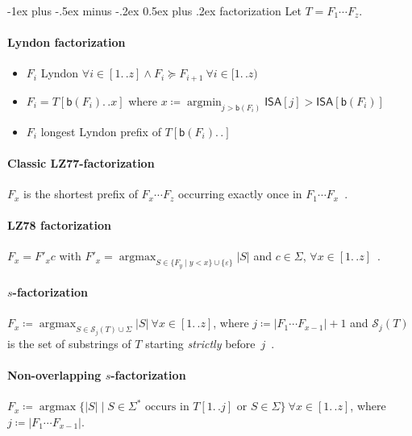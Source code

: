 \documentclass[10pt,landscape]{article}
\makeatletter
\renewcommand{\section}{\@startsection{section}{1}{0mm}%
                                {-1ex plus -.5ex minus -.2ex}%
                                {0.5ex plus .2ex}%
                                {\normalfont\large\itshape}}
\newcommand*{\IC}{\mathbin{{.}\,{.}}} %
\newcommand*{\abs}[1]{\ensuremath{|#1|}} %
\newcommand*{\menge}[1]{\ensuremath{\{#1\}}} %
\newcommand*{\instancename}[1]{\ensuremath{\mathsf{#1}}} %
\newcommand*{\ISA} {\instancename{ISA}}
\newcommand*{\textT}  {\ensuremath{T}}
\newcommand*{\ibeg}[1]{\mathsf{b}(#1)}%
\newcommand*{\argmax}{\operatorname{argmax}}
\newcommand*{\argmin}{\operatorname{argmin}}
\makeatother
\begin{document}
\begin{multicols}{2}
\section{factorization}
Let $\textT = F_1 \cdots F_z$.

\paragraph{Lyndon factorization}
	\begin{itemize}
	\item $F_i$ Lyndon  $\forall i \in [1\IC{}z] \wedge F_i \succeq F_{i+1}~\forall i\in[1\IC{}z)$  \cite{chen58lyndon}
		\item $F_i = \textT[\ibeg{F_i} \IC{} x]$ where $x \coloneqq \argmin_{j > \ibeg{F_i}} \ISA[j] > \ISA[\ibeg{F_i}]$
		\item $F_i$ longest Lyndon prefix of $\textT[\ibeg{F_i}\IC{}]$
	\end{itemize}


\newcommand*{\SubStrPrev}[2]{\mathcal{S}_{#1}(#2)}


\paragraph{Classic LZ77-factorization}
$F_x$ is the shortest prefix of $F_x \cdots F_z$ occurring exactly once in $F_1 \cdots F_x$~\cite{ziv77lz}.

\paragraph{LZ78 factorization}
$F_x=F'_x c$ with $F'_x = \argmax_{S \in \menge{F_y \mid y < x} \cup \menge{\varepsilon} } \abs{S}$ and $c\in\Sigma$, $\forall x \in [1\IC{} z]$~\cite{ziv78lz}.

\paragraph{$s$-factorization}
$F_x \coloneqq \argmax_{S \in \SubStrPrev{j}{T} \cup \Sigma} \abs{S}~\forall x \in [1\IC{} z]$, where $j \coloneqq \abs{F_1\cdots F_{x-1}}+1$
and $\SubStrPrev{j}{\textT}$ is the set of substrings of $\textT$ starting \emph{strictly} before~$j$~\cite{storer82lzss}.

\paragraph{Non-overlapping $s$-factorization}
$F_x \coloneqq \argmax \menge{ \abs{S} \mid S \in \Sigma^* \text{~occurs in~} T[1\IC{}j] \text{~or~} S \in \Sigma}~\forall
x \in [1\IC{}z]$, where $j \coloneqq \abs{F_1\cdots F_{x-1}}$.




\end{multicols}
\end{document}
